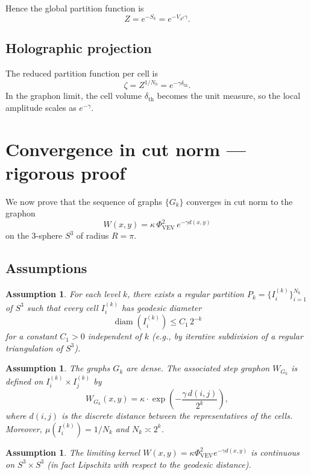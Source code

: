 \documentclass[12pt]{article}
\newtheorem{assumption}[theorem]{Assumption}
\numberwithin{equation}{section}
\newcommand{\VEV}{\Phi_{\mathrm{VEV}}}
\newcommand{\dth}{\delta_{\mathrm{th}}}
\newcommand{\SphereR}{R}
\begin{document}
Hence the global partition function is
\[
Z = e^{-S_k} = e^{-V_{S^3} \gamma}. \tag{31}
\]

\subsection{Holographic projection}

The reduced partition function per cell is
\[
\zeta = Z^{1/N_0} = e^{-\gamma \dth}. \tag{32}
\]
In the graphon limit, the cell volume \(\dth\) becomes the unit measure, so the local amplitude scales as \(e^{-\gamma}\).

\section{Convergence in cut norm — rigorous proof}
\label{sec:cutnorm}

We now prove that the sequence of graphs \(\{G_k\}\) converges in cut norm to the graphon
\[
W(x,y) = \kappa \, \VEV^2 \, e^{-\gamma d(x,y)} \tag{33}
\]
on the 3-sphere \(S^3\) of radius \(\SphereR = \pi\).

\subsection{Assumptions}

\begin{assumption}\label{ass:partition}
For each level \(k\), there exists a regular partition \(P_k = \{ I_i^{(k)} \}_{i=1}^{N_k}\) of \(S^3\) such that every cell \(I_i^{(k)}\) has geodesic diameter
\[
\operatorname{diam}(I_i^{(k)}) \le C_1 \, 2^{-k}
\]
for a constant \(C_1 > 0\) independent of \(k\) (e.g., by iterative subdivision of a regular triangulation of \(S^3\)).
\end{assumption}

\begin{assumption}\label{ass:graphs}
The graphs \(G_k\) are dense. The associated step graphon \(W_{G_k}\) is defined on \(I_i^{(k)} \times I_j^{(k)}\) by
\[
W_{G_k}(x,y) = \kappa \cdot \exp\left( -\frac{\gamma \, d(i,j)}{2^k} \right),
\]
where \(d(i,j)\) is the discrete distance between the representatives of the cells. Moreover, \(\mu(I_i^{(k)}) = 1/N_k\) and \(N_k \asymp 2^k\).
\end{assumption}

\begin{assumption}\label{ass:kernel}
The limiting kernel \(W(x,y) = \kappa \VEV^2 e^{-\gamma d(x,y)}\) is continuous on \(S^3 \times S^3\) (in fact Lipschitz with respect to the geodesic distance).
\end{assumption}
\end{document}

